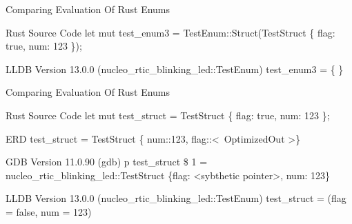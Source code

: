 \begin{frame}{Comparing Evaluation Of Rust Enums}
	
	\begin{alertblock}{Rust Source Code}
		let mut test\_enum3 = TestEnum::Struct(TestStruct \{ flag: true, num: 123 \});
    	\end{alertblock}

    	\begin{block}{LLDB Version 13.0.0}
		(nucleo\_rtic\_blinking\_led::TestEnum) test\_enum3 = \{\newline
		\newline
		\newline
		\newline
		\newline
		\text{\ \ \}}\newline
		\newline
		\newline
		\}
    	\end{block}

\end{frame}


\begin{frame}{Comparing Evaluation Of Rust Enums}
	\begin{alertblock}{Rust Source Code}
		let mut test\_struct = TestStruct \{ flag: true, num: 123 \};
    	\end{alertblock}

	\begin{block}{ERD}
		test\_struct = TestStruct \{ num::123, flag::\textless \ OptimizedOut \textgreater \}
    	\end{block}

    	\begin{block}{GDB Version 11.0.90}
		(gdb) p test\_struct\newline
		\$ 1 = nucleo\_rtic\_blinking\_led::TestStruct \{flag: \textless sybthetic pointer\textgreater, num: 123\}
    	\end{block}

    	\begin{block}{LLDB Version 13.0.0}
		(nucleo\_rtic\_blinking\_led::TestEnum) test\_struct = (flag = false, num = 123)
    	\end{block}
\end{frame}


